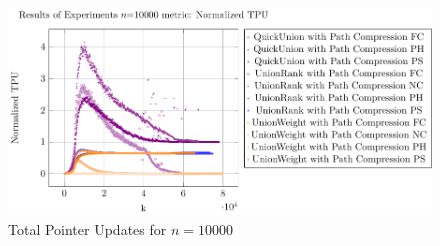 \documentclass[10pt,a4paper,hidelinks]{article}
\begin{document}
\begin{description}
    \begin{figure}[h]
        \centering
        \includegraphics[width=\linewidth]{plots/plot_10000_Normalized TPU.pdf}
        \caption{Total Pointer Updates for $n = 10000$}
    \end{figure}
\end{description}
\end{document}
